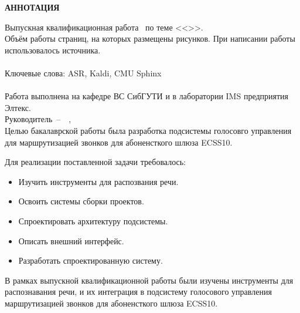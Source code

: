 \begin{center}
    \bf
    АННОТАЦИЯ
\end{center}


\noindent
Выпускная квалификационная работа \fioa\ по теме <<\topicname>>.
\hfill \\
Объём работы \pageref{LastPage} страниц, на которых размещены  рисунков.
При написании работы использовалось  источника. \\
\hfill \\
Ключевые слова: ASR, Kaldi, CMU Sphinx \\
\hfill \\
Работа выполнена на кафедре ВС СибГУТИ и в лаборатории IMS предприятия Элтекс. \\
Руководитель~--~\theadpos~\thead, \\


Целью бакалаврской работы была разработка подсистемы голосовго управления
для маршрутизацией звонков для абоненсткого шлюза ECSS10.


Для реализации поставленной задачи требовалось:
\begin{itemize}
    \item Изучить инструменты для распозвания речи.
    \item Освоить системы сборки проектов.
    \item Спроектировать архитектуру подсистемы.
    \item Описать внешний интерфейс.
    \item Разработать спроектированную систему.
\end{itemize}


В рамках выпускной квалификационной работы были изучены инструменты для
распознавания речи, и их интеграция в подсистему голосового управления
маршрутизацией звонков для абоненсткого шлюза ECSS10.


\thispagestyle{empty}
